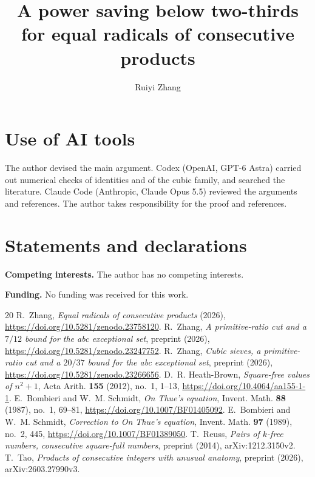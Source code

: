 \documentclass[11pt]{amsart}
\title{A power saving below two-thirds for equal radicals of consecutive products}
\author{Ruiyi Zhang}
\numberwithin{equation}{section}
\theoremstyle{definition}
\theoremstyle{remark}
\newcommand{\1}{\mathbf 1}
\begin{document}

\maketitle











\appendix





\section*{Use of AI tools}

The author devised the main argument. Codex (OpenAI, GPT-6 Astra) carried
out numerical checks of identities and of the cubic family, and searched
the literature. Claude Code (Anthropic, Claude Opus 5.5) reviewed the
arguments and references. The author takes responsibility for the proof
and references.

\section*{Statements and declarations}
\textbf{Competing interests.} The author has no competing interests.

\textbf{Funding.} No funding was received for this work.

\begin{thebibliography}{20}
 R.~Zhang, \emph{Equal radicals of consecutive products}
(2026), \url{https://doi.org/10.5281/zenodo.23758120}.
 R.~Zhang, \emph{A primitive-ratio cut and a $7/12$
bound for the abc exceptional set}, preprint (2026),
\url{https://doi.org/10.5281/zenodo.23247752}.
 R.~Zhang, \emph{Cubic sieves, a primitive-ratio cut
and a $20/37$ bound for the abc exceptional set}, preprint (2026),
\url{https://doi.org/10.5281/zenodo.23266656}.
 D.~R. Heath-Brown, \emph{Square-free values of $n^2+1$},
Acta Arith. \textbf{155} (2012), no.~1, 1--13,
\url{https://doi.org/10.4064/aa155-1-1}.
 E.~Bombieri and W.~M. Schmidt, \emph{On Thue's equation},
Invent. Math. \textbf{88} (1987), no.~1, 69--81,
\url{https://doi.org/10.1007/BF01405092}.
 E.~Bombieri and W.~M. Schmidt, \emph{Correction to
On Thue's equation}, Invent. Math. \textbf{97} (1989), no.~2, 445,
\url{https://doi.org/10.1007/BF01389050}.
 T.~Reuss, \emph{Pairs of $k$-free numbers, consecutive square-full
numbers}, preprint (2014), arXiv:1212.3150v2.
 T.~Tao, \emph{Products of consecutive integers with unusual anatomy},
preprint (2026), arXiv:2603.27990v3.
\end{thebibliography}
\end{document}
